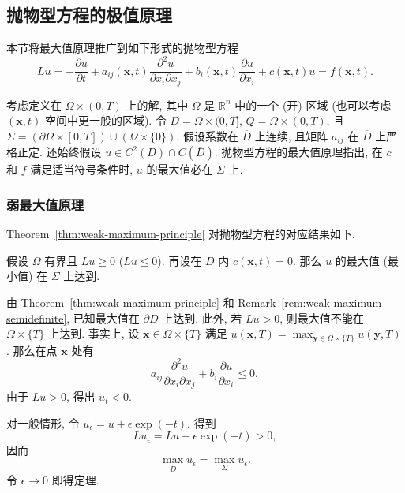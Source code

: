 \subsection{抛物型方程的极值原理}\label{sec:parabolic-maximum-principles}

本节将最大值原理推广到如下形式的抛物型方程
\begin{equation}\label{eq:parabolic-maximum-principle-operator}
Lu=-\dfrac{\partial u}{\partial t}+a_{ij}(\bm{x},t)\dfrac{\partial^2u}{\partial x_i\partial x_j}+b_i(\bm{x},t)\dfrac{\partial u}{\partial x_i}+c(\bm{x},t)u=f(\bm{x},t).
\end{equation}


考虑定义在 $\Omega\times(0,T)$ 上的解, 其中 $\Omega$ 是 $\mathbb{R}^n$ 中的一个 (开) 区域 (也可以考虑 $(\bm{x},t)$ 空间中更一般的区域). 令 $D=\Omega\times(0,T]$, $Q=\Omega\times(0,T)$, 且 $\Sigma=(\partial\Omega\times[0,T])\cup(\Omega\times\{0\})$. 假设系数在 $\overline D$ 上连续, 且矩阵 $a_{ij}$ 在 $\overline D$ 上严格正定. 还始终假设 $u\in C^2(D)\cap C(\overline D)$. 抛物型方程的最大值原理指出, 在 $c$ 和 $f$ 满足适当符号条件时, $u$ 的最大值必在 $\Sigma$ 上.

\subsubsection{弱最大值原理}\label{subsec:parabolic-weak-maximum}

Theorem~\ref{thm:weak-maximum-principle} 对抛物型方程的对应结果如下.

\begin{Theorem}
\label{thm:parabolic-weak-maximum}
假设 $\Omega$ 有界且 $Lu\geq0$ ($Lu\leq0$). 再设在 $D$ 内 $c(\bm{x},t)=0$. 那么 $u$ 的最大值 (最小值) 在 $\Sigma$ 上达到.
\end{Theorem}

\begin{Proof}
由 Theorem~\ref{thm:weak-maximum-principle} 和 Remark~\ref{rem:weak-maximum-semidefinite}, 已知最大值在 $\partial D$ 上达到. 此外, 若 $Lu>0$, 则最大值不能在 $\Omega\times\{T\}$ 上达到. 事实上, 设 $\bm{x}\in\Omega\times\{T\}$ 满足 $u(\bm{x},T)=\max_{\bm{y}\in\Omega\times\{T\}}u(\bm{y},T)$. 那么在点 $\bm{x}$ 处有
\begin{equation}\label{eq:parabolic-top-spatial-maximum-inequality}
a_{ij}\dfrac{\partial^2u}{\partial x_i\partial x_j}+b_i\dfrac{\partial u}{\partial x_i}\leq0,
\end{equation}
由于 $Lu>0$, 得出 $u_t<0$.

对一般情形, 令 $u_\epsilon=u+\epsilon\exp(-t)$. 得到
\begin{equation}\label{eq:parabolic-weak-positive-perturbation}
Lu_\epsilon=Lu+\epsilon\exp(-t)>0,
\end{equation}
因而
\begin{equation}\label{eq:parabolic-weak-boundary-maximum}
\max_{\overline D}u_\epsilon=\max_\Sigma u_\epsilon.
\end{equation}
令 $\epsilon\to0$ 即得定理.
\end{Proof}

